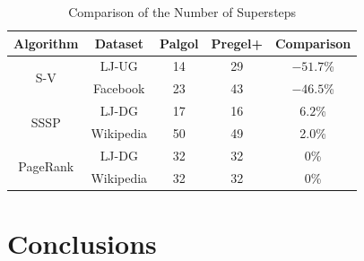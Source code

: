 \documentclass{sokendai_thesis} %
\begin{document}
\begin{table}[t]
 \centering
 \caption{Comparison of the Number of Supersteps}
 \label{tab:steps}
 \begin{tabular}{c|c|c|c|c}
  \hline
  \textbf{Algorithm} & \textbf{Dataset} & Palgol & Pregel+ & Comparison \\
  \hline\hline
  \multirow{2}{*}{S-V} & LJ-UG & 14 & 29 & $-51.7$\% \\
  \cline{2-5}
  & Facebook & 23 & 43 & $-46.5$\% \\
  \hline
  \multirow{2}{*}{SSSP} & LJ-DG & 17 & 16 & $6.2$\% \\
  \cline{2-5}
  & Wikipedia & 50 & 49 & 2.0\% \\
  \hline
  \multirow{2}{*}{PageRank} & LJ-DG & 32 & 32 & $0$\% \\
  \cline{2-5}
  & Wikipedia & 32 & 32 & $0$\% \\
  \hline
 \end{tabular}
\end{table}

\chapter{Conclusions}
\label{sec:conclusions}
\end{document}
